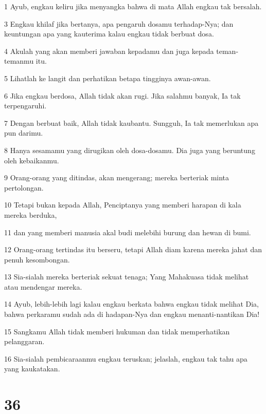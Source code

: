 \par 1 Ayub, engkau keliru jika menyangka bahwa di mata Allah engkau tak bersalah.
\par 3 Engkau khilaf jika bertanya, apa pengaruh dosamu terhadap-Nya; dan keuntungan apa yang kauterima kalau engkau tidak berbuat dosa.
\par 4 Akulah yang akan memberi jawaban kepadamu dan juga kepada teman-temanmu itu.
\par 5 Lihatlah ke langit dan perhatikan betapa tingginya awan-awan.
\par 6 Jika engkau berdosa, Allah tidak akan rugi. Jika salahmu banyak, Ia tak terpengaruhi.
\par 7 Dengan berbuat baik, Allah tidak kaubantu. Sungguh, Ia tak memerlukan apa pun darimu.
\par 8 Hanya sesamamu yang dirugikan oleh dosa-dosamu. Dia juga yang beruntung oleh kebaikanmu.
\par 9 Orang-orang yang ditindas, akan mengerang; mereka berteriak minta pertolongan.
\par 10 Tetapi bukan kepada Allah, Penciptanya yang memberi harapan di kala mereka berduka,
\par 11 dan yang memberi manusia akal budi melebihi burung dan hewan di bumi.
\par 12 Orang-orang tertindas itu berseru, tetapi Allah diam karena mereka jahat dan penuh kesombongan.
\par 13 Sia-sialah mereka berteriak sekuat tenaga; Yang Mahakuasa tidak melihat atau mendengar mereka.
\par 14 Ayub, lebih-lebih lagi kalau engkau berkata bahwa engkau tidak melihat Dia, bahwa perkaramu sudah ada di hadapan-Nya dan engkau menanti-nantikan Dia!
\par 15 Sangkamu Allah tidak memberi hukuman dan tidak memperhatikan pelanggaran.
\par 16 Sia-sialah pembicaraanmu engkau teruskan; jelaslah, engkau tak tahu apa yang kaukatakan.

\chapter{36}

